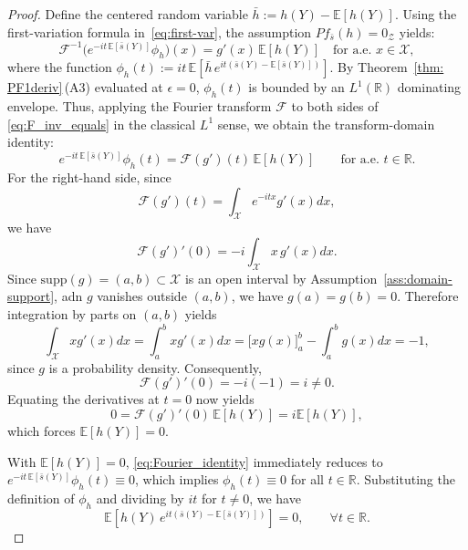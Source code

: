 \documentclass[12pt,leqno]{amsart}
\begin{document}
\begin{proof}
Define the centered random variable $\bar{h}:=h(Y)-\mathbb E[h(Y)]$. Using the first-variation formula in~\eqref{eq:first-var}, the assumption $Pf_{\bar{s}}(h)=0_{\mathcal{Z}}$ yields:
\begin{equation}\label{eq:F_inv_equals}
\mathscr{F}^{-1}\!\big(e^{-it\,\mathbb E[\bar{s}(Y)]}\phi_h\big)(x) 
= g'(x)\,\mathbb E[h(Y)] 
\quad\text{for a.e. }x\in\mathcal{X},
\end{equation}
where the function $\phi_h(t):=it\,\mathbb E\!\left[\bar{h}\,e^{it(\bar{s}(Y)-\mathbb E[\bar{s}(Y)])}\right]$. By Theorem~\ref{thm: PF1deriv}\,(A3) evaluated at $\epsilon=0$, $\phi_h(t)$ is bounded by an $L^1(\mathbb{R})$ dominating envelope. Thus, applying the Fourier transform $\mathscr{F}$ to both sides of \eqref{eq:F_inv_equals} in the classical $L^1$ sense, we obtain the transform-domain identity:
\begin{equation}\label{eq:Fourier_identity}
e^{-it\,\mathbb E[\bar{s}(Y)]}\phi_h(t)=\mathscr{F}(g')(t)\,\mathbb E[h(Y)] \qquad \text{for a.e. }t\in\mathbb R.
\end{equation}
For the right-hand side, since
\[
\mathscr F(g')(t) = \int_{\mathcal{X}} e^{-itx} g'(x)dx,
\]
we have
\[
\mathscr F(g')'(0)= -i\int_{\mathcal{X}} x\,g'(x)dx.
\]
Since $\mathrm{supp}(g)=(a,b)\subset \mathcal{X}$ is an open interval by Assumption~\ref{ass:domain-support}, adn $g$ vanishes outside $(a,b)$, we have $g(a)=g(b)=0$. Therefore integration by
parts on $(a,b)$ yields
\[
\int_{\mathcal{X}} xg'(x)dx = \int_a^b xg'(x)dx
= \Big[xg(x)\Big]_a^b - \int_a^b g(x)dx = -1,
\]
since $g$ is a probability density.
Consequently,
\[
\mathscr F(g')'(0) = -i(-1)= i \neq 0.
\]
Equating the derivatives at $t=0$ now yields
\[
0=\mathscr F(g')'(0)\,\mathbb E[h(Y)]=i\mathbb E[h(Y)],
\]
which forces $\mathbb E[h(Y)]=0$.

With $\mathbb E[h(Y)]=0$, \eqref{eq:Fourier_identity} immediately reduces to $e^{-it\,\mathbb E[\bar{s}(Y)]}\phi_h(t) \equiv 0$, which implies $\phi_h(t) \equiv 0$ for all $t \in \mathbb{R}$. Substituting the definition of $\phi_h$ and dividing by $it$ for $t \neq 0$, we have
\begin{equation}\label{eq:completeness_ortho}
\mathbb E\!\left[h(Y)\,e^{it(\bar{s}(Y)-\mathbb E[\bar{s}(Y)])}\right] = 0, \qquad \forall t \in \mathbb{R}.
\end{equation}


\end{proof}
\end{document}
